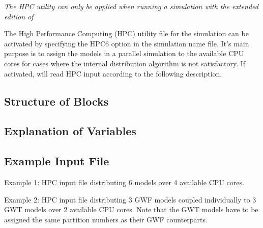\noindent \emph{The HPC utility can only be applied when running a simulation with the extended edition of \mf}
\vspace{5mm}

The High Performance Computing (HPC) utility file for the simulation can be activated by specifying the HPC6 option in the simulation name file.  It's main purpose is to assign the models in a parallel simulation to the available CPU cores for cases where the internal distribution algorithm is not satisfactory. If activated, \mf will read HPC input according to the following description.

\vspace{5mm}
\subsection{Structure of Blocks}



\vspace{5mm}
\subsection{Explanation of Variables}
\begin{description}

\end{description}

\vspace{5mm}
\subsection{Example Input File}
Example 1: HPC input file distributing 6 models over 4 available CPU cores.


\vspace{5mm}
Example 2: HPC input file distributing 3 GWF models coupled individually to 3 GWT models over 2 available CPU cores. Note that the GWT models have to be assigned the same partition numbers as their GWF counterparts.
